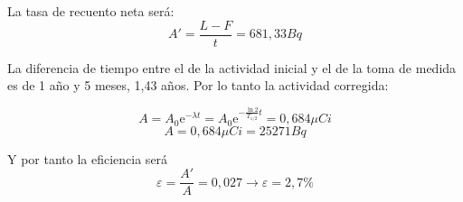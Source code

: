 \documentclass[a4paper,12pt,spanish]{article}
\begin{document}
	
	La tasa de recuento neta será:
	\[A' = \frac{L-F}{t} = 681,33\si{Bq}\]
	
	La diferencia de tiempo entre el de la actividad inicial y el de la toma de medida es de 1 año y 5 meses, 1,43 años. Por lo tanto la actividad corregida:
	
	\[ A = A_0 \text{e}^{-\lambda t}= A_0 \text{e}^{-\frac{\ln2}{T_{1/2}} t } = 0,684 \si{\mu Ci}
	\]
	\[ A = 0,684 \si{\mu Ci} = 25271 \si{Bq}
	\]
	
	Y por tanto la eficiencia será
	\[ \varepsilon = \frac{A'}{A} = 0,027 \longrightarrow \varepsilon = 2,7 \%
	\]
	
	
	
\end{document}
